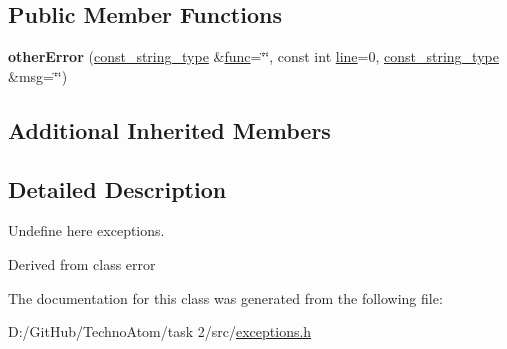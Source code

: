 \subsection*{Public Member Functions}
\begin{DoxyCompactItemize}
\item 
\mbox{\label{classatom_1_1other_error_a55d13dbae6599e17d7aa07afab4a40d3}} 
{\bfseries other\+Error} (\hyperlink{classatom_1_1error_ac330e9fb7cedcf4a173c5eb156d7bdaf}{const\+\_\+string\+\_\+type} \&\hyperlink{classatom_1_1error_a0a70a92b1638bfe4be7972651ae0c5c8}{func}=\char`\"{}\char`\"{}, const int \hyperlink{classatom_1_1error_aa9443d1a458d0dc6086372444a58e8c6}{line}=0, \hyperlink{classatom_1_1error_ac330e9fb7cedcf4a173c5eb156d7bdaf}{const\+\_\+string\+\_\+type} \&msg=\char`\"{}\char`\"{})
\end{DoxyCompactItemize}
\subsection*{Additional Inherited Members}


\subsection{Detailed Description}
Undefine here exceptions. 

Derived from class error 

The documentation for this class was generated from the following file\+:\begin{DoxyCompactItemize}
\item 
D\+:/\+Git\+Hub/\+Techno\+Atom/task 2/src/\hyperlink{exceptions_8h}{exceptions.\+h}\end{DoxyCompactItemize}
